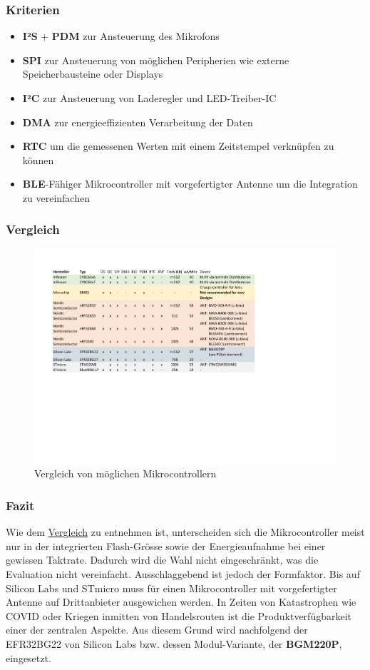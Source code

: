 \documentclass[12pt]{article}
\begin{document}
	\subsubsection{Kriterien}
	\begin{itemize}
		\item \textbf{I²S} + \textbf{PDM} zur Ansteuerung des Mikrofons
		\item \textbf{SPI} zur Ansteuerung von möglichen Peripherien wie externe Speicher\-bausteine oder Displays
		\item \textbf{I²C} zur Ansteuerung von Laderegler und LED-Treiber-IC
		\item \textbf{DMA} zur energieeffizienten Verarbeitung der Daten
		\item \textbf{RTC} um die gemessenen Werten mit einem Zeitstempel verknüpfen zu können
		\item \textbf{BLE}-Fähiger Mikrocontroller mit vorgefertigter Antenne um die Integration zu vereinfachen
	\end{itemize}
	\subsubsection{Vergleich} \label{Vergleich_uC}
	\begin{figure}[H]
		\centering
		\includegraphics[trim=55 260 230 70, width=1\linewidth]{tables/BAT_Vergleich-Mikrocontroller}
		\caption{Vergleich von möglichen Mikrocontrollern}
		\label{fig:batvergleich-mikrocontroller}
	\end{figure}
	\subsubsection{Fazit}
	Wie dem \hyperref[Vergleich_uC]{Vergleich} zu entnehmen ist, unterscheiden sich die Mikrocontroller meist nur in der integrierten Flash-Grösse sowie der Energieaufnahme bei einer gewissen Taktrate. Dadurch wird die Wahl nicht eingeschränkt, was die Evaluation nicht vereinfacht. Ausschlaggebend ist jedoch der Formfaktor. Bis auf Silicon Labs und STmicro muss für einen Mikrocontroller mit vorgefertigter Antenne auf Drittanbieter ausgewichen werden. In Zeiten von Katastrophen wie COVID oder Kriegen inmitten von Handelsrouten ist die Produktverfügbarkeit einer der zentralen Aspekte. Aus diesem Grund wird nachfolgend der EFR32BG22 von Silicon Labs bzw. dessen Modul-Variante, der \textbf{BGM220P}, eingesetzt.
	
\end{document}
